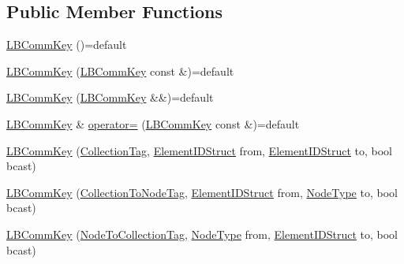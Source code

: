 \subsection*{Public Member Functions}
\begin{DoxyCompactItemize}
\item 
\hyperlink{structvt_1_1vrt_1_1collection_1_1balance_1_1_l_b_comm_key_a0de8943d958aa8cb66822cbe146e9436}{L\+B\+Comm\+Key} ()=default
\item 
\hyperlink{structvt_1_1vrt_1_1collection_1_1balance_1_1_l_b_comm_key_a63ddb8268773add0bda41a902e0028a8}{L\+B\+Comm\+Key} (\hyperlink{structvt_1_1vrt_1_1collection_1_1balance_1_1_l_b_comm_key}{L\+B\+Comm\+Key} const \&)=default
\item 
\hyperlink{structvt_1_1vrt_1_1collection_1_1balance_1_1_l_b_comm_key_a7b36d60c23c02ab4b111e56fbd7ced05}{L\+B\+Comm\+Key} (\hyperlink{structvt_1_1vrt_1_1collection_1_1balance_1_1_l_b_comm_key}{L\+B\+Comm\+Key} \&\&)=default
\item 
\hyperlink{structvt_1_1vrt_1_1collection_1_1balance_1_1_l_b_comm_key}{L\+B\+Comm\+Key} \& \hyperlink{structvt_1_1vrt_1_1collection_1_1balance_1_1_l_b_comm_key_af4941d7eb050ab8cd98a163218cb98f5}{operator=} (\hyperlink{structvt_1_1vrt_1_1collection_1_1balance_1_1_l_b_comm_key}{L\+B\+Comm\+Key} const \&)=default
\item 
\hyperlink{structvt_1_1vrt_1_1collection_1_1balance_1_1_l_b_comm_key_acd012cf418a22ee10aad59806f060be8}{L\+B\+Comm\+Key} (\hyperlink{structvt_1_1vrt_1_1collection_1_1balance_1_1_l_b_comm_key_1_1_collection_tag}{Collection\+Tag}, \hyperlink{structvt_1_1vrt_1_1collection_1_1balance_1_1_element_i_d_struct}{Element\+I\+D\+Struct} from, \hyperlink{structvt_1_1vrt_1_1collection_1_1balance_1_1_element_i_d_struct}{Element\+I\+D\+Struct} to, bool bcast)
\item 
\hyperlink{structvt_1_1vrt_1_1collection_1_1balance_1_1_l_b_comm_key_abe7f671c1bf10b20e7c350cd7e95916c}{L\+B\+Comm\+Key} (\hyperlink{structvt_1_1vrt_1_1collection_1_1balance_1_1_l_b_comm_key_1_1_collection_to_node_tag}{Collection\+To\+Node\+Tag}, \hyperlink{structvt_1_1vrt_1_1collection_1_1balance_1_1_element_i_d_struct}{Element\+I\+D\+Struct} from, \hyperlink{namespacevt_a866da9d0efc19c0a1ce79e9e492f47e2}{Node\+Type} to, bool bcast)
\item 
\hyperlink{structvt_1_1vrt_1_1collection_1_1balance_1_1_l_b_comm_key_a6d86db5b3c010d2a00bc8971c024d299}{L\+B\+Comm\+Key} (\hyperlink{structvt_1_1vrt_1_1collection_1_1balance_1_1_l_b_comm_key_1_1_node_to_collection_tag}{Node\+To\+Collection\+Tag}, \hyperlink{namespacevt_a866da9d0efc19c0a1ce79e9e492f47e2}{Node\+Type} from, \hyperlink{structvt_1_1vrt_1_1collection_1_1balance_1_1_element_i_d_struct}{Element\+I\+D\+Struct} to, bool bcast)

\end{DoxyCompactItemize}
